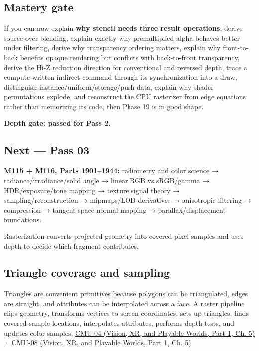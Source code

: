 \subsection{Mastery gate}\label{03-visual-computing-i-ch015-mastery-gate}

\hypertarget{03-visual-computing-i-ch015-mastery-gate}{}

If you can now explain \textbf{why stencil needs three result operations}, derive source-over blending, explain exactly why premultiplied alpha behaves better under filtering, derive why transparency ordering matters, explain why front-to-back benefits opaque rendering but conflicts with back-to-front transparency, derive the Hi-Z reduction direction for conventional and reversed depth, trace a compute-written indirect command through its synchronization into a draw, distinguish instance/uniform/storage/push data, explain why shader permutations explode, and reconstruct the CPU rasterizer from edge equations rather than memorizing its code, then Phase 19 is in good shape.

\textbf{Depth gate: passed for Pass 2.}

\subsection{Next --- Pass 03}\label{03-visual-computing-i-ch015-next-pass-03}

\hypertarget{03-visual-computing-i-ch015-next-pass-03}{}

\textbf{M115 + M116, Parts 1901--1944:} radiometry and color science → radiance/irradiance/solid angle → linear RGB vs sRGB/gamma → HDR/exposure/tone mapping → texture signal theory → sampling/reconstruction → mipmaps/LOD derivatives → anisotropic filtering → compression → tangent-space normal mapping → parallax/displacement foundations.

Rasterization converts projected geometry into covered pixel samples and uses depth to decide which fragment contributes.

\subsection{Triangle coverage and sampling}\label{03-visual-computing-i-ch015-triangle-coverage-and-sampling}

\hypertarget{03-visual-computing-i-ch015-triangle-coverage-and-sampling}{}

Triangles are convenient primitives because polygons can be triangulated, edges are straight, and attributes can be interpolated across a face. A raster pipeline clips geometry, transforms vertices to screen coordinates, sets up triangles, finds covered sample locations, interpolates attributes, performs depth tests, and updates color samples. \href{../07-Vision-XR-and-Playable-Worlds-P01/main.pdf\#nameddest=04-visual-computing-ii-ch036-cmu-04---drawing-a-triangle-and-an-intro-to-sampling}{CMU-04 (Vision, XR, and Playable Worlds, Part 1, Ch. 5)} · \href{../07-Vision-XR-and-Playable-Worlds-P01/main.pdf\#nameddest=04-visual-computing-ii-ch036-cmu-08---depth-and-transparency}{CMU-08 (Vision, XR, and Playable Worlds, Part 1, Ch. 5)}

